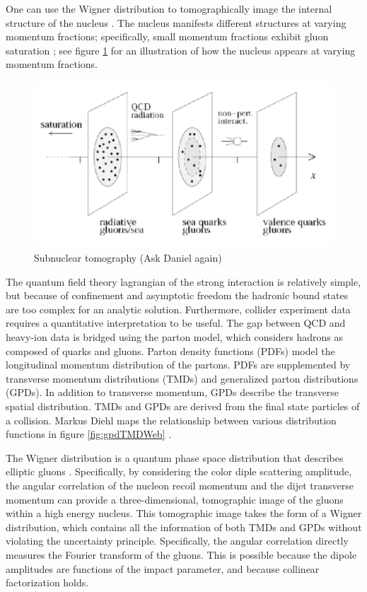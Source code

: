 One can use the Wigner distribution to tomographically image the internal structure of the nucleus \cite{Hatta:2016dxp}. The nucleus manifests different structures at varying momentum fractions; specifically, small momentum fractions exhibit gluon saturation \cite{Boer:2011fh}; see figure \ref{fig:nuclImag} for an illustration of how the nucleus appears at varying momentum fractions.

\begin{figure}[h!]
\begin{centering}
\includegraphics[width=7in]{Chapter1/importfigs/imaging_the_nucleon_upc_dijets_pres.png}
\par\end{centering}
\caption{Subnuclear tomography (Ask Daniel again) \label{fig:nuclImag}}
\end{figure}

The quantum field theory lagrangian of the strong interaction is relatively simple, but because of confinement and asymptotic freedom the hadronic bound states are too complex for an analytic solution. Furthermore, collider experiment data requires a quantitative interpretation to be useful. The gap between QCD and heavy-ion data is bridged using the parton model, which considers hadrons as composed of quarks and gluons. Parton density functions (PDFs) model the longitudinal momentum distribution of the partons. PDFs are supplemented by transverse momentum distributions (TMDs) and generalized parton distributions (GPDs). In addition to transverse momentum, GPDs describe the transverse spatial distribution. TMDs and GPDs are derived from the final state particles of a collision. Markus Diehl maps the relationship between various distribution functions in figure \ref{fig:gpdTMDWeb} \cite{Diehl:2003ny}.

The Wigner distribution is a quantum phase space distribution that describes elliptic gluons \cite{Belitsky:2003nz}. Specifically, by considering the color diple scattering amplitude, the angular correlation of the nucleon recoil momentum and the dijet transverse momentum can provide a three-dimensional, tomographic image of the gluons within a high energy nucleus. This tomographic image takes the form of a Wigner distribution, which contains all the information of both TMDs and GPDs without violating the uncertainty principle. Specifically, the angular correlation directly measures the Fourier transform of the gluons. This is possible because the dipole amplitudes are functions of the impact parameter, and because collinear factorization holds. 

